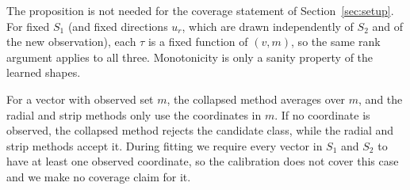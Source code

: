 The proposition is not needed for the coverage statement of Section~\ref{sec:setup}. For fixed $S_1$ (and fixed directions $u_r$, 
which are drawn independently of $S_2$ and of the new observation), each $\tau$ is a fixed function of $(v,m)$, so the same rank 
argument applies to all three. Monotonicity is only a sanity property of the learned shapes.

For a vector with observed set $m$, the collapsed method averages over $m$, and the radial and strip methods only use the 
coordinates in $m$. If no coordinate is observed, the collapsed method rejects the candidate class, while the radial and strip 
methods accept it. During fitting we require every vector in $S_1$ and $S_2$ to have at least one observed coordinate, so the 
calibration does not cover this case and we make no coverage claim for it.